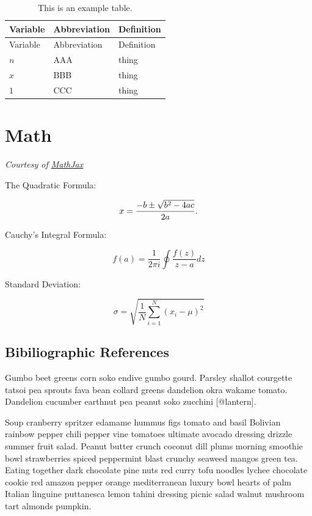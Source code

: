 \documentclass[
  11pt,
,
onecolumn,
openany
]{book}
\begin{document}
\hypertarget{tbl:variables}{}
\begin{longtable}[]{@{}lll@{}}
\caption{\label{tbl:variables}This is an example table.}\tabularnewline
\toprule
Variable & Abbreviation & Definition \\
\midrule
\endfirsthead
\toprule
Variable & Abbreviation & Definition \\
\midrule
\endhead
\(n\) & AAA & thing \\
\(x\) & BBB & thing \\
\(1\) & CCC & thing \\
\bottomrule
\end{longtable}

\hypertarget{math}{%
\section{Math}\label{math}}

\emph{Courtesy of \href{https://www.mathjax.org/\#samples}{MathJax}}

The Quadratic Formula:

\[x = {-b \pm \sqrt{b^2-4ac} \over 2a}.\]

Cauchy's Integral Formula:

\[f(a) = \frac{1}{2\pi i} \oint\frac{f(z)}{z-a}dz\]

Standard Deviation:

\[\sigma = \sqrt{ \frac{1}{N} \sum_{i=1}^N (x_i -\mu)^2}\]

\hypertarget{bibiliographic-references}{%
\subsection{Bibiliographic References}\label{bibiliographic-references}}

Gumbo beet greens corn soko endive gumbo gourd. Parsley shallot courgette
tatsoi pea sprouts fava bean collard greens dandelion okra wakame tomato.
Dandelion cucumber earthnut pea peanut soko zucchini {[}@lantern{]}.

Soup cranberry spritzer edamame hummus figs tomato and basil Bolivian rainbow
pepper chili pepper vine tomatoes ultimate avocado dressing drizzle summer
fruit salad. Peanut butter crunch coconut dill plums morning smoothie bowl
strawberries spiced peppermint blast crunchy seaweed mangos green tea. Eating
together dark chocolate pine nuts red curry tofu noodles lychee chocolate
cookie red amazon pepper orange mediterranean luxury bowl hearts of palm
Italian linguine puttanesca lemon tahini dressing picnic salad walnut mushroom
tart almonds pumpkin.
\end{document}

